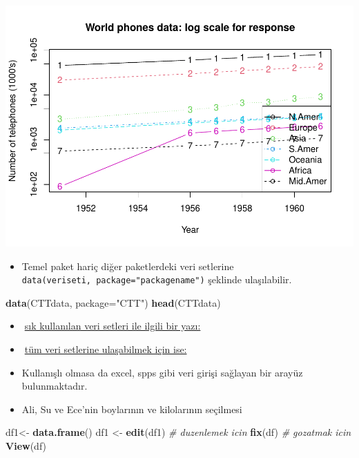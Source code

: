 \documentclass[
  oneside]{book}
\newenvironment{Shaded}{\begin{snugshade}}{\end{snugshade}}
\newcommand{\AttributeTok}[1]{\textcolor[rgb]{0.13,0.29,0.53}{#1}}
\newcommand{\CommentTok}[1]{\textcolor[rgb]{0.56,0.35,0.01}{\textit{#1}}}
\newcommand{\FunctionTok}[1]{\textcolor[rgb]{0.13,0.29,0.53}{\textbf{#1}}}
\newcommand{\NormalTok}[1]{#1}
\newcommand{\OtherTok}[1]{\textcolor[rgb]{0.56,0.35,0.01}{#1}}
\newcommand{\StringTok}[1]{\textcolor[rgb]{0.31,0.60,0.02}{#1}}
\providecommand{\tightlist}{%
  \setlength{\itemsep}{0pt}\setlength{\parskip}{0pt}}
\begin{document}
\begin{center}\includegraphics[width=1\linewidth]{06-veriseti_files/figure-latex/unnamed-chunk-18-1} \end{center}

\begin{itemize}
\tightlist
\item
  Temel paket hariç diğer paketlerdeki veri setlerine \texttt{data(veriseti,\ package="packagename")} şeklinde ulaşılabilir.
\end{itemize}

\begin{Shaded}
\begin{Highlighting}[]
\FunctionTok{data}\NormalTok{(CTTdata, }\AttributeTok{package=}\StringTok{"CTT"}\NormalTok{) }
\FunctionTok{head}\NormalTok{(CTTdata)}
\end{Highlighting}
\end{Shaded}

\begin{itemize}
\item
  🔗\href{http://r-tutorials.com/famous-useful-pre-installed-exercise-datasets-r/}{sık kullanılan veri setleri ile ilgili bir yazı:}
\item
  🔗\href{https://vincentarelbundock.github.io/Rdatasets/datasets.html}{tüm veri setlerine ulaşabilmek için ise:}
\item
  Kullanışlı olmasa da excel, spps gibi veri girişi sağlayan bir arayüz bulunmaktadır.
\item
  Ali, Su ve Ece'nin boylarının ve kilolarının seçilmesi
\end{itemize}

\begin{Shaded}
\begin{Highlighting}[]
\NormalTok{df1}\OtherTok{\textless{}{-}} \FunctionTok{data.frame}\NormalTok{() }
\NormalTok{df1 }\OtherTok{\textless{}{-}} \FunctionTok{edit}\NormalTok{(df1)}
\CommentTok{\# duzenlemek icin}
\FunctionTok{fix}\NormalTok{(df)}
\CommentTok{\# gozatmak icin }
\FunctionTok{View}\NormalTok{(df)}
\end{Highlighting}
\end{Shaded}
\end{document}
